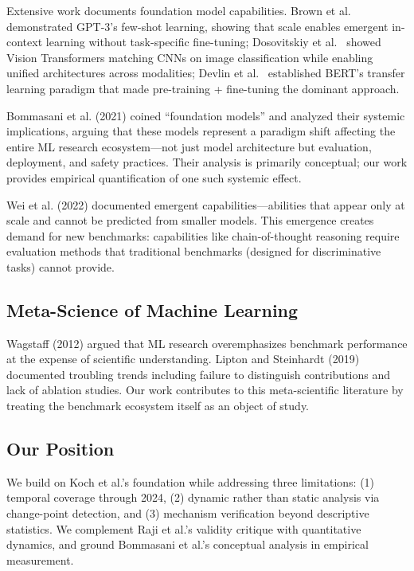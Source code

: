 Extensive work documents foundation model capabilities. Brown et al.~\cite{brown2020language} demonstrated GPT-3's few-shot learning, showing that scale enables emergent in-context learning without task-specific fine-tuning; Dosovitskiy et al.~\cite{dosovitskiy2021image} showed Vision Transformers matching CNNs on image classification while enabling unified architectures across modalities; Devlin et al.~\cite{devlin2019bert} established BERT's transfer learning paradigm that made pre-training + fine-tuning the dominant approach.

Bommasani et al. (2021) coined ``foundation models'' and analyzed their systemic implications, arguing that these models represent a paradigm shift affecting the entire ML research ecosystem---not just model architecture but evaluation, deployment, and safety practices. Their analysis is primarily conceptual; our work provides empirical quantification of one such systemic effect.

Wei et al. (2022) documented emergent capabilities---abilities that appear only at scale and cannot be predicted from smaller models. This emergence creates demand for new benchmarks: capabilities like chain-of-thought reasoning require evaluation methods that traditional benchmarks (designed for discriminative tasks) cannot provide.

\subsection{Meta-Science of Machine Learning}

Wagstaff (2012) argued that ML research overemphasizes benchmark performance at the expense of scientific understanding. Lipton and Steinhardt (2019) documented troubling trends including failure to distinguish contributions and lack of ablation studies. Our work contributes to this meta-scientific literature by treating the benchmark ecosystem itself as an object of study.

\subsection{Our Position}

We build on Koch et al.'s foundation while addressing three limitations: (1) temporal coverage through 2024, (2) dynamic rather than static analysis via change-point detection, and (3) mechanism verification beyond descriptive statistics. We complement Raji et al.'s validity critique with quantitative dynamics, and ground Bommasani et al.'s conceptual analysis in empirical measurement.
